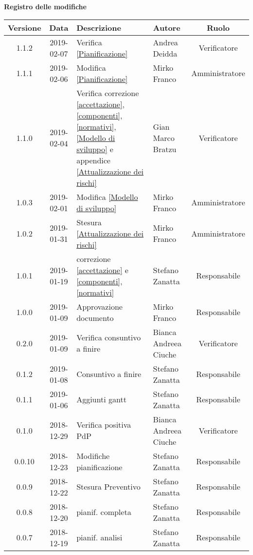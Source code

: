 	\begin{center}
		\textbf{Registro delle modifiche}
	\end{center}
	\begin{center}
		\begin{tabularx}{\textwidth}{|c|c|X|X|c|}
			\hline
			\textbf{Versione} & \textbf{Data} & \textbf{Descrizione} & \textbf{Autore} & \textbf{Ruolo} \\
			\hline
			1.1.2 & 2019-02-07 & Verifica \ref{Pianificazione} & Andrea Deidda & Verificatore\\
			\hline
			1.1.1 & 2019-02-06 & Modifica \ref{Pianificazione} & Mirko Franco & Amministratore \\
			\hline
			1.1.0 & 2019-02-04 & Verifica correzione \ref{accettazione},  \ref{componenti}, \ref{normativi}, \ref{Modello di sviluppo} e appendice \ref{Attualizzazione dei rischi} & Gian Marco Bratzu & Verificatore\\
			\hline
			1.0.3 & 2019-02-01 & Modifica \ref{Modello di sviluppo} & Mirko Franco & Amministratore \\
			\hline
			1.0.2 & 2019-01-31 & Stesura \ref{Attualizzazione dei rischi} & Mirko Franco & Amministratore \\
			\hline
			1.0.1 & 2019-01-19 & correzione \ref{accettazione} e \ref{componenti},\ref{normativi} & Stefano Zanatta & Responsabile\\
			\hline
			1.0.0 & 2019-01-09 & Approvazione documento & Mirko Franco & Responsabile\\
			\hline
			0.2.0 & 2019-01-09 & Verifica consuntivo a finire & Bianca Andreea Ciuche& Verificatore\\
			\hline
			0.1.2 & 2019-01-08 & Consuntivo a finire & Stefano Zanatta & Responsabile\\
			\hline
			0.1.1 & 2019-01-06 & Aggiunti gantt & Stefano Zanatta & Responsabile\\
			\hline
			0.1.0 & 2018-12-29 & Verifica positiva PdP & Bianca Andreea Ciuche& Verificatore\\
			\hline
			0.0.10 & 2018-12-23 & Modifiche pianificazione & Stefano Zanatta & Responsabile\\
			\hline
			0.0.9 & 2018-12-22 & Stesura Preventivo & Stefano Zanatta & Responsabile\\
			\hline
			0.0.8 & 2018-12-20 & pianif. completa& Stefano Zanatta & Responsabile\\
			\hline
			0.0.7 & 2018-12-19 & pianif. analisi& Stefano Zanatta & Responsabile\\

\end{tabularx}
\end{center}
